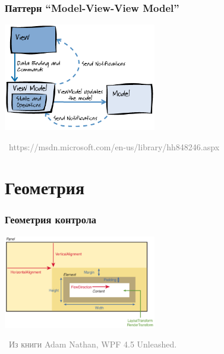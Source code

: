 \documentclass[xetex,mathserif,serif]{beamer}
\newcommand{\attribution}[1] {
\vspace{-5mm}\begin{flushright}\begin{scriptsize}\textcolor{gray}{\textcopyright\, #1}\end{scriptsize}\end{flushright}
}
\begin{document}
    \begin{frame}
        \frametitle{Паттерн ``Model-View-View Model''}
        \begin{center}
            \includegraphics[width=0.5\textwidth]{mvvm.png}
        \end{center}
        \attribution{https://msdn.microsoft.com/en-us/library/hh848246.aspx}
    \end{frame}

    \section{Геометрия}

    \begin{frame}
        \frametitle{Геометрия контрола}
        \begin{center}
            \includegraphics[width=0.5\textwidth]{controlGeometry.png}
        \end{center}
        \attribution{Из книги Adam Nathan, WPF 4.5 Unleashed.}
    \end{frame}
\end{document}
